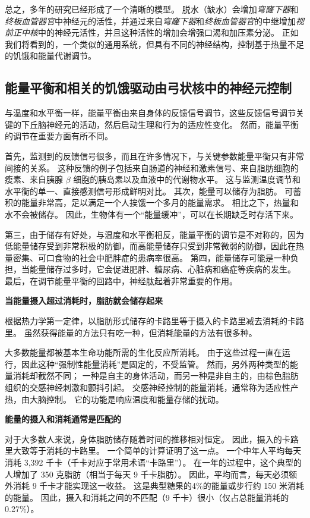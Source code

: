 总之，多年的研究已经形成了一个清晰的模型。
脱水（缺水）会增加\textit{穹窿下器}和\textit{终板血管器官}中神经元的活性，并通过来自\textit{穹窿下器}和\textit{终板血管器官}的中继增加\textit{视前正中核}中的神经元活性，并且这种活性的增加会增强口渴和加压素分泌。
正如我们将看到的，一个类似的通用系统，但具有不同的神经结构，控制基于热量不足的饥饿和能量代谢调节。



\subsection{能量平衡和相关的饥饿驱动由弓状核中的神经元控制}

与温度和水平衡一样，能量平衡由来自身体的反馈信号调节，这些反馈信号调节关键的下丘脑神经元的活动，然后启动生理和行为的适应性变化。
然而，能量平衡的调节在重要方面有所不同。


首先，监测到的反馈信号很多，而且在许多情况下，与关键参数能量平衡只有非常间接的关系。
这种反馈的例子包括来自肠道的神经和激素信号、来自脂肪细胞的瘦素、来自胰腺 $ \beta $ 细胞的胰岛素以及血液中的代谢物水平。
这与监测温度调节和水平衡的单一、直接感测信号形成鲜明对比。
其次，能量可以储存为脂肪。
可蓄积的能量非常高，足以满足一个人挨饿一个多月的能量需求。
相比之下，热量和水不会被储存。
因此，生物体有一个“能量缓冲”，可以在长期缺乏时存活下来。


第三，由于储存有好处，与温度和水平衡相反，能量平衡的调节是不对称的，因为低能量储存受到非常积极的防御，而高能量储存只受到非常微弱的防御，因此在热量密集、可口食物的社会中肥胖症的患病率很高。
第四，能量储存可能是一种负担，当能量储存过多时，它会促进肥胖、糖尿病、心脏病和癌症等疾病的发生。
最后，在调节能量平衡的回路中，神经肽起着非常重要的作用。


\textbf{当能量摄入超过消耗时，脂肪就会储存起来}

根据热力学第一定律，以脂肪形式储存的卡路里等于摄入的卡路里减去消耗的卡路里。
虽然获得能量的方法只有吃一种，但消耗能量的方法有很多种。


大多数能量都被基本生命功能所需的生化反应所消耗。
由于这些过程一直在运行，因此这种“强制性能量消耗”是固定的，不受监管。
然而，另外两种类型的能量消耗却截然不同；
一种是自主的身体活动，而另一种是非自主的，由棕色脂肪组织的交感神经刺激和颤抖引起。
交感神经控制的能量消耗，通常称为适应性产热，由大脑控制。
它的功能是响应温度和能量存储的扰动。


\textbf{能量的摄入和消耗通常是匹配的}

对于大多数人来说，身体脂肪储存随着时间的推移相对恒定。
因此，摄入的卡路里大致等于消耗的卡路里。
一个简单的计算证明了这一点。
一个中年人平均每天消耗 3,392 千卡（千卡对应于常用术语“卡路里”）。
在一年的过程中，这个典型的人增加了 350 克脂肪（相当于每天 9 千卡脂肪）。
因此，平均而言，每天必须额外消耗 9 千卡才能实现这一收益。
这是典型糖果的4\%的能量或步行约 150 米消耗的能量。
因此，摄入和消耗之间的不匹配（9 千卡）很小（仅占总能量消耗的 0.27\%）。


